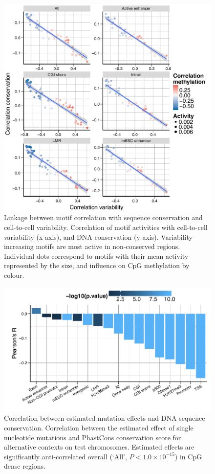 \begin{figure}[htbp!]
\centering
\includegraphics[width=1.0\textwidth]{var_cons}
\caption[Linkage between motif correlation with sequence conservation and cell-to-cell variability.]{Linkage between motif correlation with sequence conservation and cell-to-cell variability. Correlation of motif activities with cell-to-cell variability (x-axis), and DNA conservation (y-axis). Variability increasing motifs are most active in non-conserved regions. Individual dots correspond to motifs with their mean activity represented by the size, and influence on CpG methylation by colour.}
\label{fig:dcpg_var_cons}
\end{figure}

\begin{figure}[htbp!]
\centering
\includegraphics[width=1.0\textwidth]{mut_cons}
\caption[Correlation between estimated mutation effects and DNA sequence conservation.]{Correlation between estimated mutation effects and DNA sequence conservation. Correlation between the estimated effect of single nucleotide mutations and PhastCons conservation score for alternative contexts on test chromosomes. Estimated effects are significantly anti-correlated overall (`All', $P<1.0\times10^{-15}$) in CpG dense regions.}
\label{fig:dcpg_mut_cons}
\end{figure}
